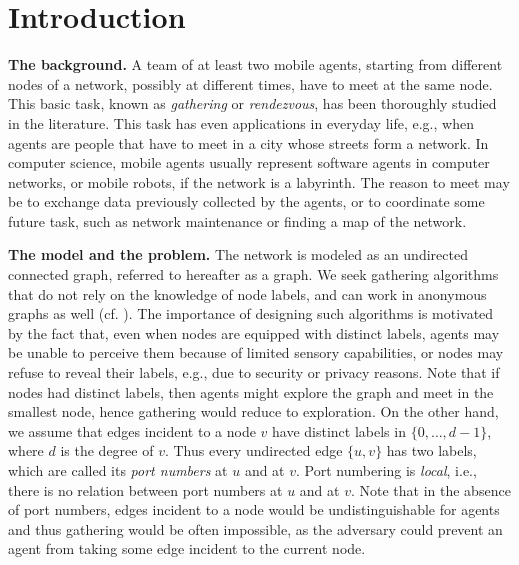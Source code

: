 \documentclass[11pt]{article}
\begin{document}
\vfill



\vfill

\thispagestyle{empty}
\setcounter{page}{0}
\pagebreak


\section{Introduction}


\noindent
{\bf The background.}
A team of at least two mobile agents, starting from different nodes of a network, possibly at different times, have to meet at the same node.
This basic task,  known  as {\em gathering} or {\em rendezvous}, has been thoroughly studied in the literature.
This task has even applications in everyday life, e.g., when agents are people that have to meet in a city whose streets form a network.
In computer science,
mobile agents usually represent software agents in computer networks, or mobile robots, if the network is a labyrinth.
The reason to meet may be to exchange data previously collected by the agents,
or to coordinate some future task, such as network maintenance or finding a map of the network.

\noindent
{\bf The model and the problem.}
The network is modeled as an undirected connected graph, referred to hereafter as a graph. 
We seek gathering algorithms that do not
rely on the knowledge of node labels, and can work in anonymous graphs as well  (cf. \cite{alpern02b}). 
The importance of designing such algorithms
is motivated by the fact that, even when nodes are equipped with distinct labels, agents may be unable to perceive them
because of limited sensory capabilities, 
or nodes may refuse to reveal their labels, e.g., due to security or privacy reasons.
Note that if nodes had distinct labels, then agents might explore the graph and meet in the smallest node, hence gathering would reduce to exploration.
On the other hand, we assume that
edges incident to a node $v$ have distinct labels in 
$\{0,\dots,d-1\}$, where $d$ is the degree of $v$. Thus every undirected
edge $\{u,v\}$ has two labels, which are called its {\em port numbers} at $u$
and at $v$. Port numbering is {\em local}, i.e., there is no relation between
port numbers at $u$ and at $v$. Note that in the absence of port numbers, edges incident to a node
would be undistinguishable for agents and thus gathering would be often impossible, 
as the adversary could prevent an agent from taking some edge incident to the current node.
\end{document}
